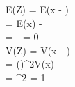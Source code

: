 E(Z) = E(x - \frac{\mu}{\sigma})\\
= E(x) - \frac{\mu}{\sigma}\\
= \frac{\mu}{\sigma} - \frac{\mu}{\sigma} = 0\\
V(Z) = V(x - \frac{\mu}{\sigma})\\
= ()^2V(x)\\
= \sigma^2 = 1